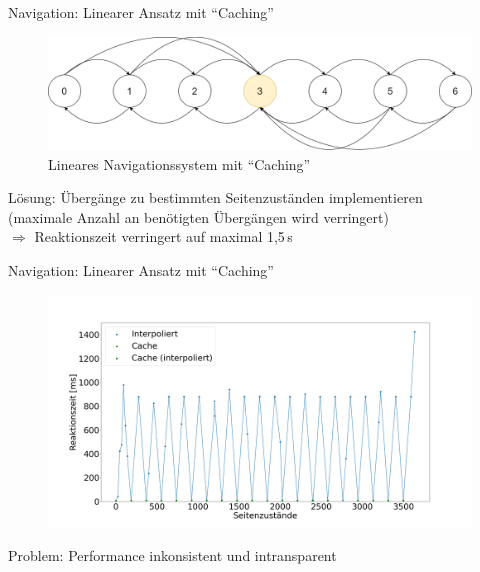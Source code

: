 \documentclass{beamer}
\begin{document}
\begin{frame}{Navigation: Linearer Ansatz mit ``Caching''}
\begin{figure}
\center
\begin{minipage}{\textwidth}
\includegraphics[width=\textwidth]{figures/navigationsystem-cache-overview-2.png}
\end{minipage}
\caption{Lineares Navigationssystem mit ``Caching''}
\end{figure}
Lösung: Übergänge zu bestimmten Seitenzuständen implementieren \\
\hspace{1em}(maximale Anzahl an benötigten Übergängen wird verringert)\\
$\Rightarrow$ Reaktionszeit verringert auf maximal 1,5\,s
\end{frame}

\begin{frame}{Navigation: Linearer Ansatz mit ``Caching''}
\begin{figure}
\center
\begin{minipage}{\textwidth}
\includegraphics[width=\textwidth]{figures/performance_cache.png}
\end{minipage}
\end{figure}
Problem: Performance inkonsistent und intransparent
\end{frame}
\end{document}
